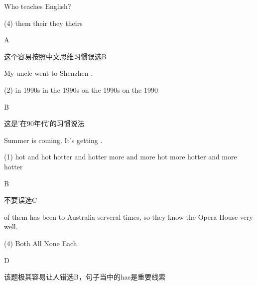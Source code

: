 \begin{question}[tags={xiaoxuect}]
Who teaches \blank[width=1cm]{} English?

  \begin{tasks}(4)
    \task them   \task their
    \task they   \task theirs
  \end{tasks}
\end{question}
\begin{solution}
A

这个容易按照中文思维习惯误选B
\end{solution}

\begin{question}[tags={xiaoxuect}]
My uncle went to Shenzhen \blank[width=1cm]{}.

  \begin{tasks}(2)
    \task in 1990s       \task in the 1990s
    \task on the 1990s   \task on the 1990
  \end{tasks}
\end{question}
\begin{solution}
B

这是'在90年代'的习惯说法
\end{solution}

\begin{question}[tags={xiaoxuect}]
Summer is coming. It's getting \blank[width=1cm]{}.

  \begin{tasks}(1)
    \task hot and hot         \task hotter and hotter
    \task more and more hot   \task more hotter and more hotter
  \end{tasks}
\end{question}
\begin{solution}
B

不要误选C
\end{solution}

\begin{question}[tags={xiaoxuect}]
\blank*[width=1cm]{} of them has been to Australia serveral times, so they know the Opera House very well.

  \begin{tasks}(4)
    \task Both         \task All
    \task None         \task Each
  \end{tasks}
\end{question}
\begin{solution}
D

该题极其容易让人错选B，句子当中的has是重要线索
\end{solution}

